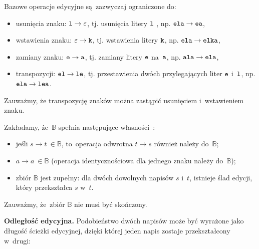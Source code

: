 \documentclass{praca1}
\begin{document}
Bazowe operacje edycyjne są~zazwyczaj ograniczone do:
\begin{itemize}
\item usunięcia znaku: $\verb|l| \rightarrow \varepsilon$, tj. usunięcia litery $\verb|l|$ , np. $\verb|ela| \rightarrow \verb|ea|$,
\item wstawienia znaku: $\varepsilon \rightarrow \verb|k|$, tj. wstawienia litery $\verb|k|$, np. $\verb|ela| \rightarrow \verb|elka|$,
\item zamiany znaku: $\verb|e| \rightarrow \verb|a|$, tj. zamiany litery $\verb|e|$ na~$\verb|a|$, np. $\verb|ala| \rightarrow \verb|ela|$,
\item transpozycji: $\verb|el| \rightarrow \verb|le|$, tj. przestawienia dwóch przylegających liter $\verb|e|$ i~$\verb|l|$, np. $\verb|ela| \rightarrow \verb|lea|$.
\end{itemize}

Zauważmy, że transpozycję znaków można zastąpić usunięciem i~wstawieniem znaku. 


\begin{property}\label{wl:001}
Zakładamy, że~$\mathbb{B}$ spełnia następujące własności~\cite{Boytsov2011:indexingmethods}:
\begin{itemize}
\item jeśli $s \rightarrow t~\in \mathbb{B}$, to~operacja odwrotna $t \rightarrow s$ również należy do~$\mathbb{B}$;
\item $a \rightarrow a~\in \mathbb{B}$ (operacja identycznościowa dla jednego znaku należy do~$\mathbb{B}$);
\item zbiór $\mathbb{B}$ jest zupełny: dla dwóch dowolnych napisów $s$ i~$t$, istnieje ślad edycji, który przekształca $s$ w~$t$.
\end{itemize}
\end{property}

Zauważmy, że~zbiór $\mathbb{B}$ nie musi być skończony.

\textbf{Odległość edycyjna.} Podobieństwo dwóch napisów może być wyrażone jako długość ścieżki edycyjnej, dzięki której jeden napis zostaje przekształcony w~drugi:
\end{document}
